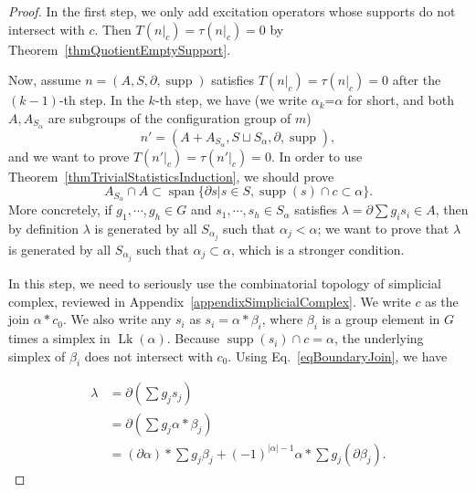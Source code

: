 \documentclass[reprint, amsmath, amssymb, showpacs, floatfix, longbibliography, aps, twocolumn, superscriptaddress, nofootinbib]{revtex4-2}
\newcommand{\supp}{\operatorname{supp}}
\theoremstyle{definition}
\begin{document}
\begin{proof}
	In the first step, we only add excitation operators whose supports do not intersect with $c$. Then $T(n|_c)=\tau(n|_c)=0$ by Theorem~\ref{thmQuotientEmptySupport}.
	
	Now, assume $n=(A,S,\partial,\supp)$ satisfies $T(n|_c)=\tau(n|_c)=0$ after the $(k-1)$-th step. In the $k$-th step, we have (we write $\alpha_k$=$\alpha$ for short, and both $A,A_{S_{\alpha}}$ are subgroups of the configuration group of $m$)
	\begin{equation}
		n'=(A+A_{S_{\alpha}},S\sqcup S_\alpha,\partial,\supp),
	\end{equation}
	and we want to prove $T(n'|_c)=\tau(n'|_c)=0$.
	In order to use Theorem~\ref{thmTrivialStatisticsInduction}, we should prove 
	\begin{equation}
		A_{S_\alpha}\cap A\subset \operatorname{span}\{\partial s|s\in S,\supp(s)\cap c\subset \alpha\}.
	\end{equation}
	More concretely, if $g_1,\cdots,g_h\in G$ and $s_1,\cdots,s_h\in S_\alpha$ satisfies 
	$\lambda=\partial\sum g_is_i\in A$, then by definition $\lambda$ is generated by all $S_{\alpha_j}$ such that $\alpha_j<\alpha$; we want to prove that $\lambda$ is generated by all $S_{\alpha_j}$ such that $\alpha_j\subset \alpha$, which is a stronger condition.
	
	In this step, we need to seriously use the combinatorial topology of simplicial complex, reviewed in Appendix~\ref{appendixSimplicialComplex}.
	We write $c$ as the join $\alpha*c_0$. 
	 We also write any $s_i$ as  $s_i=\alpha*\beta_i$, where $\beta_i$ is a group element in $G$ times a simplex in $\operatorname{Lk}(\alpha)$. Because $\supp(s_i)\cap c=\alpha$, the underlying simplex of $\beta_i$ does not intersect with $c_0$. Using Eq.~\eqref{eqBoundaryJoin}, we have
	 
	 \begin{equation}
	 	\begin{aligned}
	 		\lambda&=\partial(\sum g_j s_j)\\&=\partial(\sum g_j\alpha*\beta_j)\\&=(\partial\alpha)*\sum g_j\beta_j+(-1)^{|\alpha|-1}\alpha*\sum g_j(\partial\beta_j).
	 	\end{aligned}
	 \end{equation}
	 

\end{proof}
\end{document}
